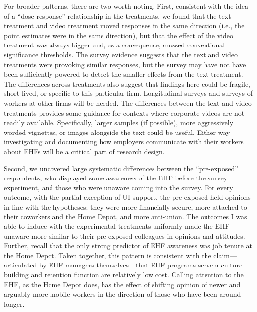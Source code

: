 \documentclass[
  11pt,
  oneside]{article}
\begin{document}
For broader patterns, there are two worth noting. First, consistent with the idea of a ``dose-response'' relationship in the treatments, we found that the text treatment and video treatment moved responses in the same direction (i.e., the point estimates were in the same direction), but that the effect of the video treatment was always bigger and, as a consequence, crossed conventional significance thresholds. The survey evidence suggests that the text and video treatments were provoking similar responses, but the survey may have not have been sufficiently powered to detect the smaller effects from the text treatment. The differences across treatments also suggest that findings here could be fragile, short-lived, or specific to this particular firm. Longitudinal surveys and surveys of workers at other firms will be needed. The differences between the text and video treatments provides some guidance for contexts where corporate videos are not readily available. Specifically, larger samples (if possible), more aggressively worded vignettes, or images alongside the text could be useful. Either way investigating and documenting how employers communicate with their workers about EHFs will be a critical part of research design.

Second, we uncovered large systematic differences between the ``pre-exposed'' respondents, who displayed some awareness of the EHF before the survey experiment, and those who were unaware coming into the survey. For every outcome, with the partial exception of UI support, the pre-exposed held opinions in line with the hypotheses: they were more financially secure, more attached to their coworkers and the Home Depot, and more anti-union. The outcomes I was able to induce with the experimental treatments uniformly made the EHF-unaware more similar to their pre-exposed colleagues in opinions and attitudes. Further, recall that the only strong predictor of EHF awareness was job tenure at the Home Depot. Taken together, this pattern is consistent with the claim---articulated by EHF managers themselves---that EHF programs serve a culture-building and retention function are relatively low cost. Calling attention to the EHF, as the Home Depot does, has the effect of shifting opinion of newer and arguably more mobile workers in the direction of those who have been around longer.
\end{document}
